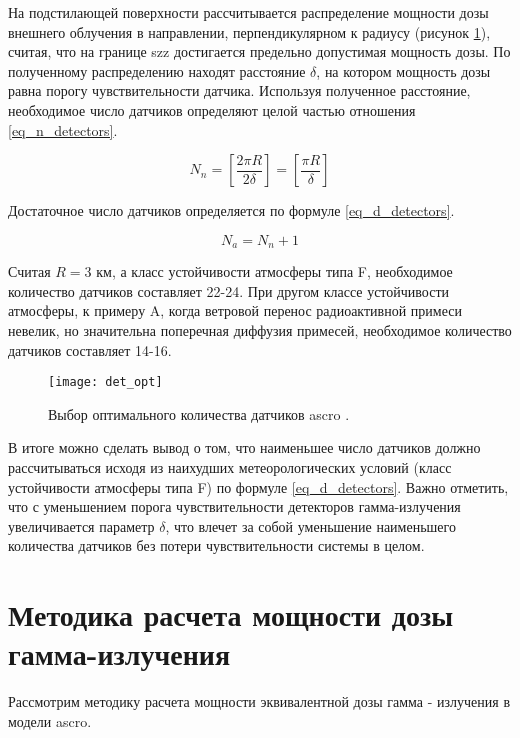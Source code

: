 На подстилающей поверхности рассчитывается распределение мощности дозы внешнего облучения в направлении, 
перпендикулярном к радиусу (рисунок \ref{fig_det_opt}), считая, что на границе \ac{szz} достигается предельно допустимая
мощность дозы. По полученному распределению находят расстояние $\delta$, на котором мощность дозы равна порогу 
чувствительности датчика. Используя полученное расстояние, необходимое число датчиков определяют целой частью отношения 
\ref{eq_n_detectors}.

\begin{equation}
    \label{eq_n_detectors}
    N_n = [\frac{2 \pi R}{2 \delta}] = [\frac{\pi R}{\delta}]
\end{equation}

Достаточное число датчиков определяется по формуле \ref{eq_d_detectors}.

\begin{equation}
    \label{eq_d_detectors}
    N_a = N_n + 1
\end{equation}

Считая $R = 3$ км, а класс устойчивости атмосферы типа F, необходимое количество датчиков составляет 22-24. При другом классе
устойчивости атмосферы, к примеру A, когда ветровой перенос радиоактивной примеси невелик, но значительна поперечная диффузия
примесей, необходимое количество датчиков составляет 14-16.

\begin{figure}[ht!]
    \centering
    \texttt{[image: det\_opt]}
    \captionsetup{justification=centering}
    \caption{Выбор оптимального количества датчиков \ac{ascro} \cite{elokhin}.}
    \label{fig_det_opt}
\end{figure}


В итоге можно сделать вывод о том, что наименьшее число датчиков должно рассчитываться исходя из наихудших метеорологических
условий (класс устойчивости атмосферы типа F) по формуле \ref{eq_d_detectors}. Важно отметить, что с уменьшением порога 
чувствительности детекторов гамма-излучения увеличивается параметр $\delta$, что влечет за собой уменьшение наименьшего
количества датчиков без потери чувствительности системы в целом.

\section{Методика расчета мощности дозы гамма-излучения}

Рассмотрим методику расчета мощности эквивалентной дозы гамма - излучения в модели \ac{ascro}.

